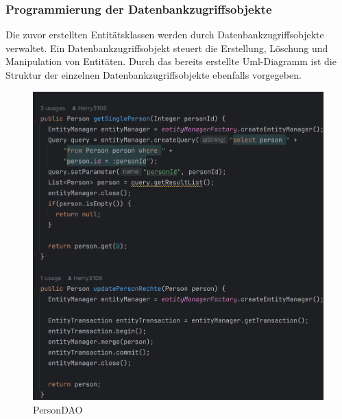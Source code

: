 \documentclass[11pt]{article}
\begin{document}
    \newpage
    \subsubsection{Programmierung der Datenbankzugriffsobjekte}
    Die zuvor erstellten Entitätsklassen werden durch Datenbankzugriffsobjekte verwaltet. Ein Datenbankzugriffsobjekt steuert die Erstellung, Löschung und Manipulation von Entitäten.
    Durch das bereits erstellte Uml-Diagramm ist die Struktur der einzelnen Datenbankzugriffsobjekte ebenfalls vorgegeben.
    \begin{figure}[H]
        \centering
        \includegraphics[width=\textwidth]{abbildungen/Person-DAO.png}
        \caption{PersonDAO}
        \label{person-dao}
    \end{figure} 
\end{document}
